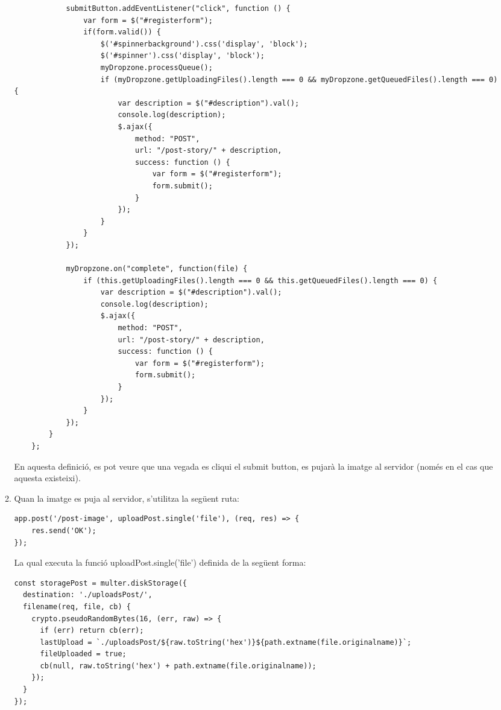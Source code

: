 \documentclass[11pt,catalan,listoffigures,listoftables]{tfgetsinf}
\begin{document}
\begin{enumerate}
\begin{enumerate}
\begin{lstlisting}
            submitButton.addEventListener("click", function () {
                var form = $("#registerform");
                if(form.valid()) {
                    $('#spinnerbackground').css('display', 'block');
                    $('#spinner').css('display', 'block');
                    myDropzone.processQueue();
                    if (myDropzone.getUploadingFiles().length === 0 && myDropzone.getQueuedFiles().length === 0) {
                        var description = $("#description").val();
                        console.log(description);
                        $.ajax({
                            method: "POST",
                            url: "/post-story/" + description,
                            success: function () {
                                var form = $("#registerform");
                                form.submit();
                            }
                        });
                    }
                }
            });

            myDropzone.on("complete", function(file) {
                if (this.getUploadingFiles().length === 0 && this.getQueuedFiles().length === 0) {
                    var description = $("#description").val();
                    console.log(description);
                    $.ajax({
                        method: "POST",
                        url: "/post-story/" + description,
                        success: function () {
                            var form = $("#registerform");
                            form.submit();
                        }
                    });
                }
            });
        }
    };
\end{lstlisting}
En aquesta definició, es pot veure que una vegada es cliqui el submit button, es pujarà la imatge al servidor (només en el cas que aquesta existeixi).
\item Quan la imatge es puja al servidor, s'utilitza la següent ruta:
\begin{lstlisting}
app.post('/post-image', uploadPost.single('file'), (req, res) => {
    res.send('OK');
});
\end{lstlisting}
La qual executa la funció uploadPost.single('file') definida de la següent forma:
\begin{lstlisting}
const storagePost = multer.diskStorage({
  destination: './uploadsPost/',
  filename(req, file, cb) {
    crypto.pseudoRandomBytes(16, (err, raw) => {
      if (err) return cb(err);
      lastUpload = `./uploadsPost/${raw.toString('hex')}${path.extname(file.originalname)}`;
      fileUploaded = true;
      cb(null, raw.toString('hex') + path.extname(file.originalname));
    });
  }
});


\end{lstlisting}
\end{enumerate}
\end{enumerate}
\end{document}
